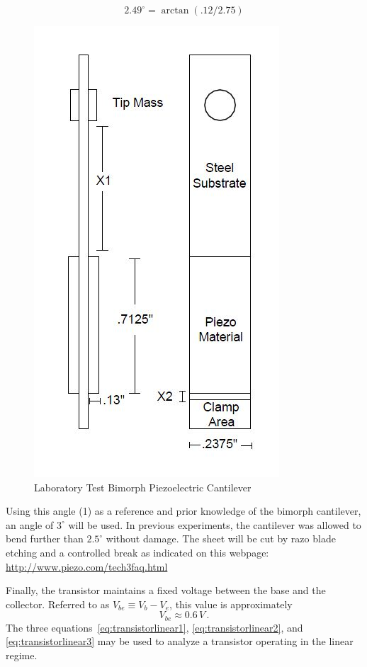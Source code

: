 \documentclass[aps,prl,twocolumn,groupedaddress]{revtex4}
\begin{document}
\begin{equation}
 2.49 ^\circ = \arctan (.12/2.75)
\end{equation}

\begin{figure}[ht!]
  \centering
  \includegraphics[scale=0.6]{Bimorph_Cantilever.jpg}
  \caption{Laboratory Test Bimorph Piezoelectric Cantilever}
\end{figure}

Using this angle (1) as a reference and prior knowledge of the bimorph cantilever, an angle of $3^\circ$ will be used. In previous experiments, the cantilever was allowed to bend further than $2.5^\circ$ without damage. The sheet will be cut by razo blade etching and a controlled break as indicated on this webpage: \url{http://www.piezo.com/tech3faq.html}


Finally, the transistor maintains a fixed voltage between the base and the collector.  Referred to as $V_{be} \equiv V_b - V_e$, this value is approximately 
\begin{equation}
	V_{be} \approx 0.6 \, V \, .
	\label{eq:transistorlinear3}
\end{equation}
The three equations~\ref{eq:transistorlinear1}, \ref{eq:transistorlinear2}, and \ref{eq:transistorlinear3} may be used to analyze a transistor operating in the linear regime. 
\end{document}
